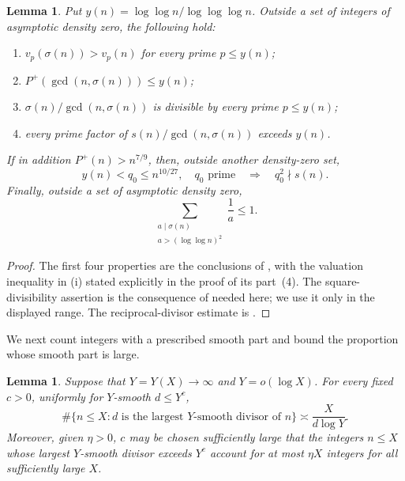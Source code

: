 \documentclass[11pt,letterpaper,reqno]{amsart}
\numberwithin{equation}{section}
\newtheorem{lemma}[theorem]{Lemma}
\theoremstyle{remark}
\newcommand{\1}{\mathbf 1}
\renewcommand{\leq}{\leqslant}
\begin{document}
\begin{lemma}\label{lem:LP-inputs}
Put $y(n)=\log\log n/\log\log\log n$. Outside a set of integers of asymptotic density
zero, the following hold:
\begin{enumerate}
\item $v_p(\sigma(n))>v_p(n)$ for every prime $p\leq y(n)$;
\item $P^+(\gcd(n,\sigma(n)))\leq y(n)$;
\item $\sigma(n)/\gcd(n,\sigma(n))$ is divisible by every prime
 $p\leq y(n)$;
\item every prime factor of $s(n)/\gcd(n,\sigma(n))$ exceeds $y(n)$.
\end{enumerate}
If in addition $P^+(n)>n^{7/9}$, then, outside another density-zero set,
\[
 y(n)<q_0\leq n^{10/27},\quad q_0\text{ prime}
 \quad\Longrightarrow\quad q_0^2\nmid s(n).
\]
Finally, outside a set of asymptotic density zero,
\[
 \sum_{\substack{a\mid\sigma(n)\\a>(\log\log n)^2}}\frac1a\leq1.
\]
\end{lemma}

\begin{proof}
The first four properties are the conclusions of
\cite[Lemma~2.1]{LucaPomerance}, with the valuation inequality in \textup{(i)}
stated explicitly in the proof of its part~(4). The square-divisibility
assertion is the consequence of \cite[Lemma~2.2]{LucaPomerance} needed here;
we use it only in the displayed range. The reciprocal-divisor estimate
is \cite[Lemma~2.5]{LucaPomerance}.
\end{proof}

We next count integers with a prescribed smooth part and bound the proportion whose smooth part is large.

\begin{lemma}\label{lem:smooth-part-input}
Suppose that $Y=Y(X)\to\infty$ and $Y=o(\log X)$. For every fixed
$c>0$, uniformly for $Y$-smooth
$d\leq Y^c$,
\[
 \#\{n\leq X:d\text{ is the largest $Y$-smooth divisor of }n\}
 \asymp \frac{X}{d\log Y}.
\]
Moreover, given $\eta>0$, $c$ may be chosen sufficiently large that the
integers $n\leq X$ whose largest $Y$-smooth divisor exceeds $Y^c$ account
for at most $\eta X$ integers for all sufficiently large $X$.
\end{lemma}
\end{document}
